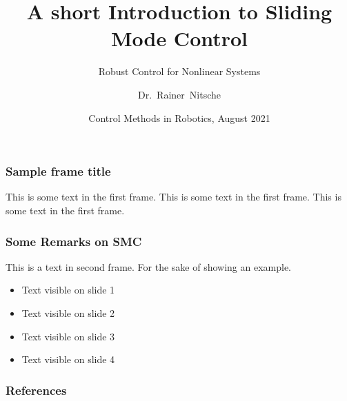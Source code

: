 \documentclass{beamer}
\title[Sliding Mode Control] %
{A short Introduction to Sliding Mode Control}
\subtitle{Robust Control for Nonlinear Systems}
\author[Rainer Nitsche] %
{Dr.~Rainer~Nitsche\inst{1}} %
\institute[Festo SE \& Co. KG] %
{
  \inst{1}%
  Dept. Robotics\\
 System Design Group
}
\date[ \today] %
{Control Methods in Robotics, August 2021}
\begin{document}
\frame{\titlepage}

\begin{frame}
\frametitle{Sample frame title}
This is some text in the first frame. This is some text in the first frame. This is some text in the first frame.
\end{frame}

\begin{frame}
\frametitle{Some Remarks on SMC}
This is a text in second frame. 
For the sake of showing an example.

\begin{itemize}
 \item<1-> Text visible on slide 1
 \item<2-> Text visible on slide 2
 \item<3> Text visible on slide 3
 \item<4-> Text visible on slide 4
\end{itemize}
\end{frame}





\begin{frame}
\frametitle{References}
\printbibliography
\end{frame}
\end{document}
